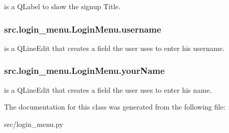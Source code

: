 is a Q\+Label to show the signup Title. 

\hypertarget{classsrc_1_1login__menu_1_1_login_menu_a6b5acd3b5dd7c538b601cf8ab1b1d4cf}{}
\subsubsection[{username}]{\setlength{\rightskip}{0pt plus 5cm}src.\+login\+\_\+menu.\+Login\+Menu.\+username}\label{classsrc_1_1login__menu_1_1_login_menu_a6b5acd3b5dd7c538b601cf8ab1b1d4cf}


is a Q\+Line\+Edit that creates a field the user uses to enter his username. 

\hypertarget{classsrc_1_1login__menu_1_1_login_menu_a6ba84d7d5a18940588ad710b7f6f964c}{}
\subsubsection[{your\+Name}]{\setlength{\rightskip}{0pt plus 5cm}src.\+login\+\_\+menu.\+Login\+Menu.\+your\+Name}\label{classsrc_1_1login__menu_1_1_login_menu_a6ba84d7d5a18940588ad710b7f6f964c}


is a Q\+Line\+Edit that creates a field the user uses to enter his name. 



The documentation for this class was generated from the following file\+:\begin{DoxyCompactItemize}
\item 
src/login\+\_\+menu.\+py\end{DoxyCompactItemize}
